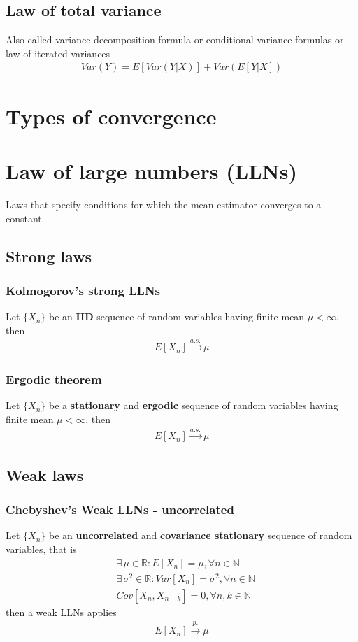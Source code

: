\documentclass[../main.tex]{subfiles}
\begin{document}
\subsection{Law of total variance}
Also called variance decomposition formula or conditional variance formulas or law of iterated variances
\begin{align*}
    Var(Y) = E[Var(Y | X)] + Var(E[Y | X])
\end{align*}

\section{Types of convergence}

\section{Law of large numbers (LLNs)}
Laws that specify conditions for which the mean estimator converges to a constant.
\subsection{Strong laws}
\subsubsection{Kolmogorov's strong LLNs}
Let $\{X_n\}$ be an \textbf{IID} sequence of random variables having finite mean $\mu < \infty$, then
\begin{align*}
    E[X_n] \xrightarrow{a. s.} \mu
\end{align*}

\subsubsection{Ergodic theorem}
Let $\{X_n\}$ be a \textbf{stationary} and \textbf{ergodic} sequence of random variables having finite mean $\mu < \infty$, then
\begin{align*}
    E[X_n] \xrightarrow{a. s.} \mu
\end{align*}

\subsection{Weak laws}
\subsubsection{Chebyshev's Weak LLNs - uncorrelated}
Let $\{X_n\}$ be an \textbf{uncorrelated} and \textbf{covariance stationary} sequence of random variables, that is
\begin{align*}
    &\exists\, \mu \in \mathbb{R}: E[X_n] = \mu, \forall n \in \mathbb{N} \\
    &\exists\, \sigma^2 \in \mathbb{R}: Var[X_n] = \sigma^2, \forall n \in \mathbb{N} \\
    & Cov[X_n, X_{n+k}] = 0, \forall n,k \in \mathbb{N}
\end{align*}
then a weak LLNs applies
\begin{align*}
    E[X_n] \xrightarrow{p.} \mu
\end{align*}
\end{document}
